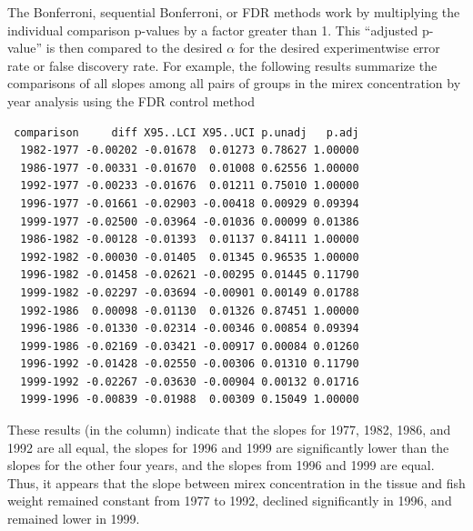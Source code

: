 \documentclass[10pt,openany]{book}\usepackage[]{graphicx}\usepackage[]{color}
\makeatletter
\newenvironment{kframe}{%
 \def\at@end@of@kframe{}%
 \ifinner\ifhmode%
  \def\at@end@of@kframe{\end{minipage}}%
  \begin{minipage}{\columnwidth}%
 \fi\fi%
 \def\FrameCommand##1{\hskip\@totalleftmargin \hskip-\fboxsep
 \colorbox{shadecolor}{##1}\hskip-\fboxsep
     \hskip-\linewidth \hskip-\@totalleftmargin \hskip\columnwidth}%
 \MakeFramed {\advance\hsize-\width
   \@totalleftmargin\z@ \linewidth\hsize
   \@setminipage}}%
 {\par\unskip\endMakeFramed%
 \at@end@of@kframe}
\newenvironment{knitrout}{}{} %
\makeatother
\begin{document}

\vspace{-12pt}

The Bonferroni, sequential Bonferroni, or FDR methods work by multiplying the individual comparison p-values by a factor greater than 1.  This ``adjusted p-value'' is then compared to the desired $\alpha$ for the desired experimentwise error rate or false discovery rate.  For example, the following results summarize the comparisons of all slopes among all pairs of groups in the mirex concentration by year analysis using the FDR control method

\begin{knitrout}
\color{fgcolor}\begin{kframe}
\begin{verbatim}
 comparison     diff X95..LCI X95..UCI p.unadj   p.adj
  1982-1977 -0.00202 -0.01678  0.01273 0.78627 1.00000
  1986-1977 -0.00331 -0.01670  0.01008 0.62556 1.00000
  1992-1977 -0.00233 -0.01676  0.01211 0.75010 1.00000
  1996-1977 -0.01661 -0.02903 -0.00418 0.00929 0.09394
  1999-1977 -0.02500 -0.03964 -0.01036 0.00099 0.01386
  1986-1982 -0.00128 -0.01393  0.01137 0.84111 1.00000
  1992-1982 -0.00030 -0.01405  0.01345 0.96535 1.00000
  1996-1982 -0.01458 -0.02621 -0.00295 0.01445 0.11790
  1999-1982 -0.02297 -0.03694 -0.00901 0.00149 0.01788
  1992-1986  0.00098 -0.01130  0.01326 0.87451 1.00000
  1996-1986 -0.01330 -0.02314 -0.00346 0.00854 0.09394
  1999-1986 -0.02169 -0.03421 -0.00917 0.00084 0.01260
  1996-1992 -0.01428 -0.02550 -0.00306 0.01310 0.11790
  1999-1992 -0.02267 -0.03630 -0.00904 0.00132 0.01716
  1999-1996 -0.00839 -0.01988  0.00309 0.15049 1.00000
\end{verbatim}
\end{kframe}
\end{knitrout}

These results (in the  column) indicate that the slopes for 1977, 1982, 1986, and 1992 are all equal, the slopes for 1996 and 1999 are significantly lower than the slopes for the other four years, and the slopes from 1996 and 1999 are equal.  Thus, it appears that the slope between mirex concentration in the tissue and fish weight remained constant from 1977 to 1992, declined significantly in 1996, and remained lower in 1999.
\end{document}
